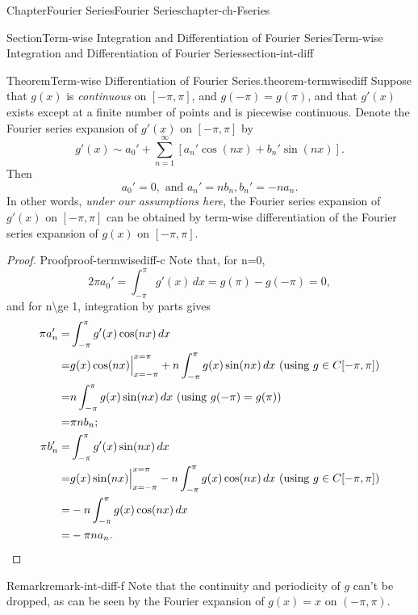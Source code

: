 \documentclass[oneside,10pt,]{book}
\numberwithin{equation}{section}
\newcommand{\qedhere}{\relax}
\newcommand{\amp}{&}
\begin{document}
\begin{chapterptx}{Chapter}{Fourier Series}{}{Fourier Series}{}{}{chapter-ch-Fseries}
\begin{sectionptx}{Section}{Term-wise Integration and Differentiation of Fourier Series}{}{Term-wise Integration and Differentiation of Fourier Series}{}{}{section-int-diff}
\begin{theorem}{Theorem}{Term-wise Differentiation of Fourier Series.}{}{theorem-termwisediff}%
Suppose that  \(g(x)\) is \emph{continuous} on \([-\pi, \pi]\), and  \(g(-\pi)=g(\pi)\), and that \(g'(x)\) exists except at a finite number of points and is piecewise continuous. Denote the Fourier series expansion of \(g'(x)\) on \([-\pi, \pi]\) by%
\begin{equation*}
g'(x)\sim a_0' +\sum_{n=1}^{\infty}\left[ a_n' \cos (nx)+ b_n' \sin (nx) \right].
\end{equation*}
Then%
\begin{equation*}
a_0'=0, \text{ and } a_n'=n b_{n}, b_n'=- n a_{n}.
\end{equation*}
In other words, \emph{under our assumptions here}, the Fourier series expansion of \(g'(x)\) on \([-\pi, \pi]\) can be obtained by term-wise differentiation of the Fourier series expansion of \(g(x)\) on \([-\pi, \pi]\).\end{theorem}
\begin{proof}{Proof}{}{proof-termwisediff-c}
Note that, for \textdollar{}n=0\textdollar{},%
\begin{equation*}
2\pi a_{0}'=\int_{-\pi}^{\pi} g'(x)\, dx=g(\pi)-g(-\pi)=0,
\end{equation*}
and for \textdollar{}n\textbackslash{}ge 1\textdollar{}, integration by parts gives%
\begin{align*}
\pi a_{n}' =  \amp \int_{-\pi}^{\pi } g'(x) \cos (nx) \, dx \\
= \amp g(x) \cos (nx) \Big|_{x=-\pi}^{x=\pi}+ n
\int_{-\pi}^{\pi} g(x) \sin (nx) \, dx \text{ (using $g \in C[-\pi, \pi] $)}\\
= \amp n
\int_{-\pi}^{\pi} g(x) \sin (nx) \, dx \text{ (using $ g(-\pi)=g(\pi)$) }\\
= \amp \pi n b_{n};\\
\pi b_{n}'= \amp \int_{-\pi}^{\pi} g'(x) \sin (nx) \, dx \\
=  \amp g(x) \sin (nx) \Big|_{x=-\pi}^{x=\pi}- n
\int_{-\pi}^{\pi} g(x) \cos (nx) \, dx \text{ (using $ g \in C[-\pi, \pi]$)} \\
= \amp - n \int_{-\pi}^{\pi} g(x) \cos (nx) \, dx \\
= \amp -\pi n a_{n}. \qedhere
\end{align*}
\end{proof}
\begin{remark}{Remark}{}{remark-int-diff-f}%
Note that the continuity and periodicity of \(g\) can't be dropped, as can be seen by the Fourier expansion of \(g(x)=x\) on \((-\pi, \pi)\).\end{remark}

\end{sectionptx}
\end{chapterptx}
\end{document}
